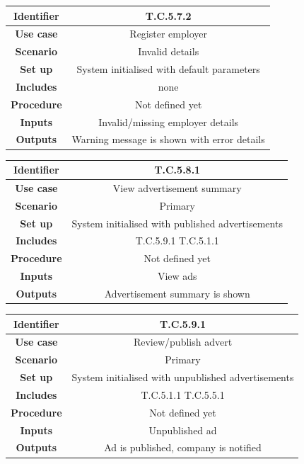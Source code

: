 \documentclass{l3deliverable}
\begin{document}
\begin{tabular}{|c|c|}
\hline \textbf{Identifier} & T.C.5.7.2\\
\hline \textbf{Use case} & Register employer\\
\hline \textbf{Scenario} & Invalid details\\
\hline \textbf{Set up} & System initialised with default parameters\\
\hline \textbf{Includes} & none\\
\hline \textbf{Procedure} & Not defined yet\\
\hline \textbf{Inputs} & Invalid/missing employer details\\
\hline \textbf{Outputs} & Warning message is shown with error details\\
\hline
\end{tabular}

\begin{tabular}{|c|c|}
\hline \textbf{Identifier} & T.C.5.8.1\\
\hline \textbf{Use case} & View advertisement summary\\
\hline \textbf{Scenario} & Primary\\
\hline \textbf{Set up} & System initialised with published advertisements\\
\hline \textbf{Includes} & T.C.5.9.1 T.C.5.1.1\\
\hline \textbf{Procedure} & Not defined yet\\
\hline \textbf{Inputs} & View ads\\
\hline \textbf{Outputs} & Advertisement summary is shown\\
\hline
\end{tabular}

\begin{tabular}{|c|c|}
\hline \textbf{Identifier} & T.C.5.9.1\\
\hline \textbf{Use case} & Review/publish advert\\
\hline \textbf{Scenario} & Primary\\
\hline \textbf{Set up} & System initialised with unpublished advertisements\\
\hline \textbf{Includes} & T.C.5.1.1 T.C.5.5.1\\
\hline \textbf{Procedure} & Not defined yet\\
\hline \textbf{Inputs} & Unpublished ad\\
\hline \textbf{Outputs} & Ad is published, company is notified\\
\hline
\end{tabular}
\end{document}
